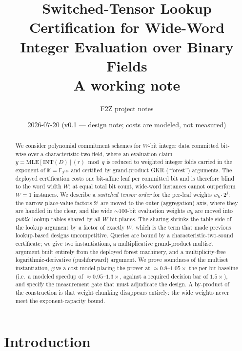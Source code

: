 \documentclass[11pt]{article}
\title{Switched-Tensor Lookup Certification for Wide-Word\\
Integer Evaluation over Binary Fields\\[0.6ex]
\large A working note}
\author{F2Z project notes}
\date{2026-07-20 \quad (v0.1 --- design note; costs are modeled, not measured)}
\theoremstyle{definition}
\newcommand{\K}{\mathbb{K}}
\newcommand{\F}{\mathbb{F}}
\newcommand{\INT}{\mathrm{INT}}
\newcommand{\MLE}{\mathrm{MLE}}
\begin{document}
\maketitle

\begin{abstract}
We consider polynomial commitment schemes for $W$-bit integer data committed
bit-wise over a characteristic-two field, where an evaluation claim
$y=\MLE[\INT(D)](r)\bmod q$ is reduced to weighted integer folds carried in
the exponent of $\K=\F_{2^{128}}$ and certified by grand-product GKR
(``forest'') arguments. The deployed certification costs one bit-affine leaf
per committed bit and is therefore blind to the word width $W$: at equal
total bit count, wide-word instances cannot outperform $W=1$ instances. We
describe a \emph{switched tensor order} for the per-leaf weights
$w_b\cdot 2^j$: the narrow place-value factors $2^j$ are moved to the outer
(aggregation) axis, where they are handled in the clear, and the wide
$\sim\!100$-bit evaluation weights $w_b$ are moved into \emph{public}
lookup tables shared by all $W$ bit-planes. The sharing shrinks the table
side of the lookup argument by a factor of exactly $W$, which is the term
that made previous lookup-based designs uncompetitive. Queries are bound by
a characteristic-two-sound certificate; we give two instantiations, a
multiplicative grand-product multiset argument built entirely from the
deployed forest machinery, and a multiplicity-free logarithmic-derivative
(pushforward) argument. We prove soundness of the multiset instantiation,
give a cost model placing the prover at $\approx 0.8$--$1.05\times$ the
per-bit baseline (i.e.\ a modeled speedup of $\approx 0.95$--$1.3\times$,
against a required decision bar of $1.5\times$), and specify the
measurement gate that must adjudicate the design. A by-product of the
construction is that weight chunking disappears entirely: the wide weights
never meet the exponent-capacity bound.
\end{abstract}

\section{Introduction}\label{sec:intro}
\end{document}
